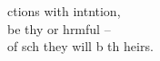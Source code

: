  ctions with intntion,\\
be thy  or hrmful --\\
of sch  they will b th heirs.

\clearpage

%
%
%
%
%
%
%
%
%
%
